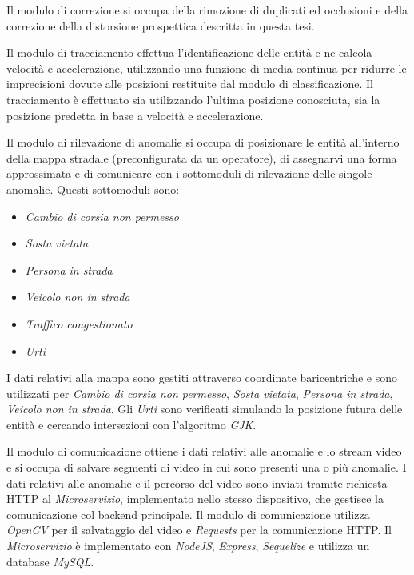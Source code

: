 Il modulo di correzione si occupa della rimozione di duplicati ed occlusioni e della correzione della distorsione prospettica descritta in questa tesi.

Il modulo di tracciamento effettua l'identificazione delle entità e ne calcola velocità e accelerazione, utilizzando una funzione di media continua per ridurre le imprecisioni dovute alle posizioni restituite dal modulo di classificazione.
Il tracciamento è effettuato sia utilizzando l'ultima posizione conosciuta, sia la posizione predetta in base a velocità e accelerazione.

Il modulo di rilevazione di anomalie si occupa di posizionare le entità all'interno della mappa stradale (preconfigurata da un operatore), di assegnarvi una forma approssimata e di comunicare con i sottomoduli di rilevazione delle singole anomalie. Questi sottomoduli sono:
\begin{itemize}
    \item \emph{Cambio di corsia non permesso}
    \item \emph{Sosta vietata}
    \item \emph{Persona in strada}
    \item \emph{Veicolo non in strada}
    \item \emph{Traffico congestionato}
    \item \emph{Urti}
\end{itemize}
I dati relativi alla mappa sono gestiti attraverso coordinate baricentriche e sono utilizzati per \emph{Cambio di corsia non permesso}, \emph{Sosta vietata}, \emph{Persona in strada}, \emph{Veicolo non in strada}.
Gli \emph{Urti} sono verificati simulando la posizione futura delle entità e cercando intersezioni con l'algoritmo \emph{GJK}\cite{arch:gjk}.

Il modulo di comunicazione ottiene i dati relativi alle anomalie e lo stream video e si occupa di salvare segmenti di video in cui sono presenti una o più anomalie.
I dati relativi alle anomalie e il percorso del video sono inviati tramite richiesta HTTP al \emph{Microservizio}, implementato nello stesso dispositivo, che gestisce la comunicazione col backend principale.
Il modulo di comunicazione utilizza \emph{OpenCV}\cite{arch:opencv} per il salvataggio del video e \emph{Requests}\cite{arch:requests} per la comunicazione HTTP.
Il \emph{Microservizio} è implementato con \emph{NodeJS}\cite{arch:nodejs}, \emph{Express}\cite{arch:express}, \emph{Sequelize}\cite{arch:sequelize} e utilizza un database \emph{MySQL}\cite{arch:mysql}.

